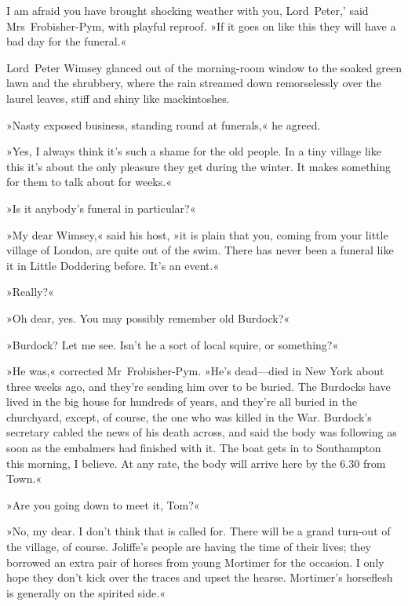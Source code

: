 
\lettrine[lines=4,ante=‘]{I}{} am afraid you have brought shocking weather with you, Lord~Peter,' said Mrs~Frobisher-Pym, with playful reproof. »If it goes on like this they will have a bad day for the funeral.«

\zz
Lord~Peter Wimsey glanced out of the morning-room window to the soaked green lawn and the shrubbery, where the rain streamed down remorselessly over the laurel leaves, stiff and shiny like mackintoshes.

»Nasty exposed business, standing round at funerals,« he agreed.

»Yes, I always think it's such a shame for the old people. In a tiny village like this it's about the only pleasure they get during the winter. It makes something for them to talk about for weeks.«

»Is it anybody's funeral in particular?«

»My dear Wimsey,« said his host, »it is plain that you, coming from your little village of London, are quite out of the swim. There has never been a funeral like it in Little Doddering before. It's an event.«

»Really?«

»Oh dear, yes. You may possibly remember old Burdock?«

»Burdock? Let me see. Isn't he a sort of local squire, or something?«

»He was,« corrected Mr~Frobisher-Pym. »He's dead—died in New York about three weeks ago, and they're sending him over to be buried. The Burdocks have lived in the big house for hundreds of years, and they're all buried in the churchyard, except, of course, the one who was killed in the War. Burdock's secretary cabled the news of his death across, and said the body was following as soon as the embalmers had finished with it. The boat gets in to Southampton this morning, I believe. At any rate, the body will arrive here by the 6.30 from Town.«

»Are you going down to meet it, Tom?«

»No, my dear. I don't think that is called for. There will be a grand turn-out of the village, of course. Joliffe's people are having the time of their lives; they borrowed an extra pair of horses from young Mortimer for the occasion. I only hope they don't kick over the traces and upset the hearse. Mortimer's horseflesh is generally on the spirited side.«

